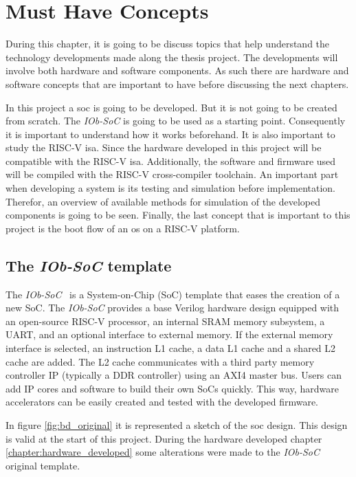\chapter{Must Have Concepts}
\label{chapter:must_have_concepts}
During this chapter, it is going to be discuss topics that help understand the technology developments made along the thesis project. The developments will involve both hardware and software components. As such there are hardware and software concepts that are important to have before discussing the next chapters.

In this project a \acrshort{soc} is going to be developed. But it is not going to be created from scratch. The \textit{IOb-SoC} is going to be used as a starting point. Consequently it is important to understand how it works beforehand. It is also important to study the RISC-V \acrfull{isa}. Since the hardware developed in this project will be compatible with the RISC-V \acrshort{isa}. Additionally, the software and firmware used will be compiled with the RISC-V cross-compiler toolchain. An important part when developing a system is its testing and simulation before implementation. Therefor, an overview of available methods for simulation of the developed components is going to be seen. Finally, the last concept that is important to this project is the boot flow of an \acrfull{os} on a RISC-V platform.

\section{The \textit{IOb-SoC} template}
\label{section:the_iob_soc_template}
The \textit{IOb-SoC}~\cite{iob_soc_repo} is a System-on-Chip (SoC) template that eases the creation of a new SoC. The \textit{IOb-SoC} provides a base Verilog hardware design equipped with an open-source RISC-V processor, an internal SRAM memory subsystem, a UART, and an optional interface to external memory. If the external memory interface is selected, an instruction L1 cache, a data L1 cache and a shared L2 cache are added. The L2 cache communicates with a third party memory controller IP (typically a DDR controller) using an AXI4 master bus. Users can add IP cores and software to build their own SoCs quickly. This way, hardware accelerators can be easily created and tested with the developed firmware.

In figure \ref{fig:bd_original} it is represented a sketch of the \acrshort{soc} design. This design is valid at the start of this project. During the hardware developed chapter \ref{chapter:hardware_developed} some alterations were made to the \textit{IOb-SoC} original template.

